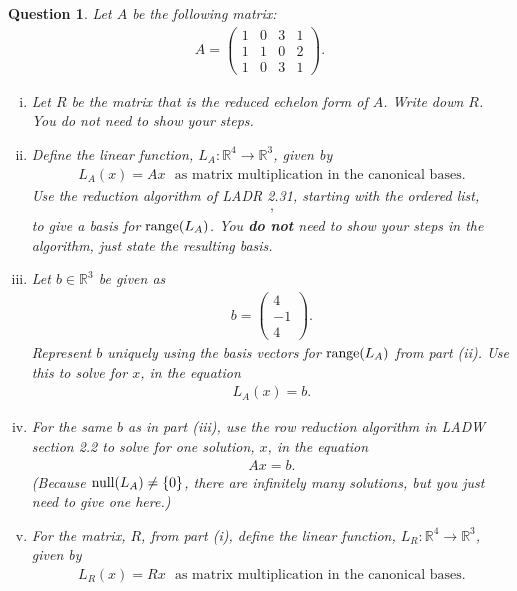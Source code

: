 \documentclass[12pt]{article}
\newtheorem{question}[thm]{Question}
\def\real{{\mathbb R}}
\def\NullLA{\textnormal{null}}
\def\range{\textnormal{range}}
\newcommand{\ColVecThree}[3]{\begin{pmatrix} #1\\ #2\\ #3\end{pmatrix}}
\begin{document}
\begin{question}
	\normalfont
	
	Let $A$ be the following matrix:
	\begin{align*}
		A = 
		\begin{pmatrix}
			1 & 0 & 3 & 1\\
			1 & 1 & 0 & 2\\
			1 & 0 & 3 & 1
		\end{pmatrix}.
	\end{align*}
	
	\begin{enumerate}[(i)]
		\item Let $R$ be the matrix that is the reduced echelon form of $A$.  Write down $R$.  You do not need to show your steps. 
		   
		
		
		\item Define the linear function, $L_A:\real^4\to\real^3$, given by 
		\begin{align*}
			L_A(x) = Ax\ \ \ \text{as matrix multiplication in the canonical bases}.
		\end{align*}
		Use the reduction algorithm of LADR 2.31, starting with the ordered list, 
		\begin{align*}
			[L_A(e_1), L_A(e_2), L_A(e_3), L_A(e_4)],
		\end{align*}
		to give a basis for $\range(L_A)$.  You \textbf{do not} need to show your steps in the algorithm, just state the resulting basis.
		
		
		\item Let $b\in\real^3$ be given as
		\begin{align*}
			b=\ColVecThree{4}{-1}{4}.
		\end{align*} 
		Represent $b$ uniquely using the basis vectors for $\range(L_A)$ from part (ii).  Use this to solve for $x$, in the equation
		\begin{align*}
			L_A(x) = b.
		\end{align*}
		
		\item For the same $b$ as in part (iii), use the row reduction algorithm in LADW section 2.2 to solve for one solution, $x$, in the equation
		\begin{align*}
			Ax=b.
		\end{align*}
		(Because $\NullLA(L_A)\not=\{0\}$, there are infinitely many solutions, but you just need to give one here.)
		
		
		\item For the matrix, $R$, from part (i), define the linear function, $L_R:\real^4\to\real^3$, given by 
		\begin{align*}
			L_R(x) = Rx\ \ \ \text{as matrix multiplication in the canonical bases}.
		\end{align*}
		

\end{enumerate}
\end{question}
\end{document}
